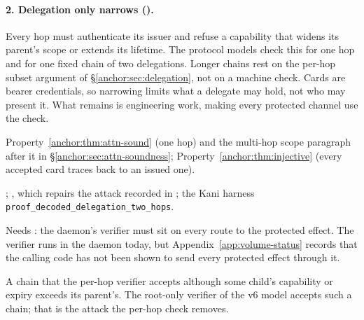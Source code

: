 \paragraph{2. Delegation only narrows ().}
Every hop must authenticate its issuer and refuse a capability that widens its
parent's scope or extends its lifetime. The protocol models check this for one
hop and for one fixed chain of two delegations. Longer chains rest on the
per-hop subset argument of \S\ref{anchor:sec:delegation}, not on a machine
check. Cards are bearer credentials, so narrowing limits what a delegate may
hold, not who may present it. What remains is engineering work, making every
protected channel use the check.
\begin{description}[leftmargin=1.4em,itemsep=1pt]
  \item[Result] Property~\ref{anchor:thm:attn-sound} (one hop) and the
  multi-hop scope paragraph after it in \S\ref{anchor:sec:attn-soundness};
  Property~\ref{anchor:thm:injective} (every accepted card traces back to an
  issued one).
  \item[Artifact] ;
  , which repairs the attack
  recorded in ; the Kani
  harness \texttt{proof\_decoded\_delegation\_two\_hops}.
  \item[Mode] Needs : the daemon's verifier must sit on
  every route to the protected effect. The verifier runs in the daemon today,
  but Appendix~\ref{app:volume-status} records that the calling code has not
  been shown to send every protected effect through it.
  \item[Falsifier] A chain that the per-hop verifier accepts although some
  child's capability or expiry exceeds its parent's. The root-only verifier of
  the v6 model accepts such a chain; that is the attack the per-hop check
  removes.
\end{description}

